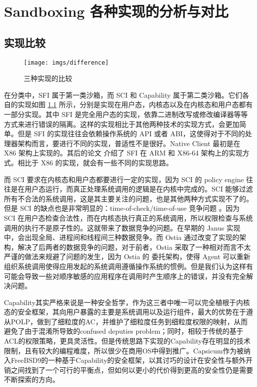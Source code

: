 \chapter{Sandboxing 各种实现的分析与对比}
\label{s:evaluation}

\section{实现比较}
\label{ss: comparision}

\begin{figure}[!htp]
  \centering
  \texttt{[image: imgs/difference]}
  \caption{三种实现的比较}
  \label{fig:difference}
\end{figure}

在分类中，SFI 属于第一类沙箱，而 SCI 和 Capability 属于第二类沙箱。它们各自的实现如图 \ref{fig:difference} 所示，分别是实现在用户态，内核态以及在内核态和用户态都有一部分实现。其中 SFI 是完全用户态的实现，依靠二进制改写或修改编译器等等方式来进行错误的隔离。这样的实现相比于其他两种技术的实现方式，会更加简单。但是 SFI 的实现往往会依赖操作系统的 API 或者 ABI，这使得对于不同的处理器架构而言，要进行不同的实现，普适性不是很好。Native Client 最初是在 X86 架构上实现的。其后的论文 \parencite{sehr2010adapting} 介绍了 SFI 在 ARM 和 X86-64 架构上的实现方式。相比于 X86 的实现，就会有一些不同的实现思路。

而 SCI 要求在内核态和用户态都要进行一定的实现，因为 SCI 的 policy engine 往往是在用户态运行，而真正处理系统调用的逻辑是在内核中完成的。SCI 能够过滤所有不合法的系统调用，这是其主要关注的问题，也是其他两种方式实现不了的。但是 SCI 的缺点也是非常明显的：time-of-check/time-of-use 竞争问题 \parencite{bishop1996checking}。因为 SCI 在用户态检查合法性，而在内核态执行真正的系统调用，所以权限检查与系统调用的执行不是原子性的。这就带来了数据竞争的问题。在早期的 Janus 实现中，会出现全局、进程间和线程间三种数据竞争。而 Ostia 通过改变了实现的架构，解决了后两者的数据竞争的问题，对于前者，Ostia 采取了一种相对而言不太严谨的做法来规避了问题的发生，因为 Ostia 的 委托架构，使得 Agent 可以重新组织系统调用使得应用发起的系统调用遵循操作系统的惯例。但是我们认为这样有可能会导致一些对顺序敏感的应用程序在调用时产生顺序上的错误，并没有完全解决问题。

Capability其实严格来说是一种安全哲学，作为这三者中唯一可以完全植根于内核态的安全框架，其向用户暴露的主要是系统调用以及运行组件，最大的优势在于遵从POLP，做到了细粒度的AC，并维护了细粒度任务到细粒度权限的映射，从而避免了由于混淆所导致的confused deputies problem；同时，相较于传统的基于ACL的权限策略，更具灵活性。但是传统思路下实现的Capability存在明显的技术限制，且有较大的编程难度，所以很少在商用OS中得到推广。Capsicum作为被纳入FreeBSD9的一种基于Capability的安全框架，以其讨巧的设计在安全性与额外开销之间找到了一个可行的平衡点，但如何以更小的代价得到更高的安全性仍是需要不断探索的方向。

